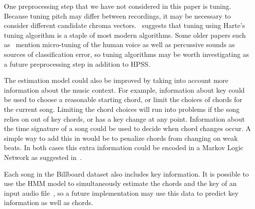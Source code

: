 \documentclass{article}
\begin{document}
One preprocessing step that we have not considered in this paper is tuning.
Because tuning pitch may differ between recordings, it may be necessary to
consider different candidate chroma vectors.~\cite{McVicar:00} suggests that
tuning using Harte's tuning algorithm is a staple of most modern algorithms.
Some older papers such as~\cite{Zenz:20} mention micro-tuning of the human
voice as well as percussive sounds as sources of classification error, so
tuning algorithms may be worth investigating as a future preprocessing step in
addition to HPSS\@.

The estimation model could also be improved by taking into account more
information about the music context. For example, information about key could
be used to choose a reasonable starting chord, or limit the choices of chords
for the current song. Limiting the chord choices will run into problems if the
song relies on out of key chords, or has a key change at any point. Information
about the time signature of a song could be used to decide when chord changes
occur. A simple way to add this in would be to penalize chords from changing on
weak beats. In both cases this extra information could be encoded in a Markov
Logic Network as suggested in~\cite{Papadopoulus:04}.

Each song in the Billboard dataset also includes key information. It is
possible to use the HMM model to simultaneously estimate the chords and the key
of an input audio file~\cite{McVicar:00}, so a future implementation may use
this data to predict key information as well as chords.
\end{document}
